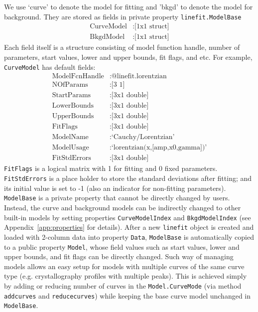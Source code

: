 \documentclass[reprint,showpacs,prb,nofootinbib,amsmath,amssymb]{revtex4-1}
\begin{document}
We use `curve' to denote the model for fitting and 'bkgd' to denote the model for background. They are stored as fields in private property \verb|linefit.ModelBase|
\begin{align}
	\mbox{CurveModel} 	&: \mbox{[1x1 struct]} \nonumber \\
	\mbox{BkgdModel}	&: \mbox{[1x1 struct]} \nonumber 
\end{align}
Each field itself is a structure consisting of model function handle, number of parameters, start values, lower and upper bounds, fit flags, and etc. For example, \verb|CurveModel| has default fields:
\begin{align}
	\mbox{ModelFcnHandle} 	&: \mbox{@linefit.lorentzian} \nonumber \\
	\mbox{NOfParams}	&: \mbox{[3 1]} \nonumber \\
	\mbox{StartParams}	&: \mbox{[3x1 double]} \nonumber \\
	\mbox{LowerBounds}	&: \mbox{[3x1 double]} \nonumber \\
	\mbox{UpperBounds}	&: \mbox{[3x1 double]} \nonumber \\
	\mbox{FitFlags}		&: \mbox{[3x1 double]} \nonumber \\
	\mbox{ModelName}	&: \mbox{`Cauchy/Lorentzian'} \nonumber \\	
	\mbox{ModelUsage}	&: \mbox{`lorentzian(x,[amp,x0,gamma])'} \nonumber \\
	\mbox{FitStdErrors}	&: \mbox{[3x1 double]} \nonumber 					
\end{align}
\verb|FitFlags| is a logical matrix with 1 for fitting and 0 fixed parameters. \verb|FitStdErrors| is a place holder to store the standard deviations after fitting; and its initial value is set to -1 (also an indicator for non-fitting parameters). \verb|ModelBase| is a private property that cannot be directly changed by users. Instead, the curve and background models can be indirectly changed to other built-in models by setting properties \verb|CurveModelIndex| and \verb|BkgdModelIndex| (see Appendix~\ref{app:properties} for details). After a new \verb|linefit| object is created and loaded with 2-column data into property \verb|Data|, \verb|ModelBase| is automatically copied to a public property \verb|Model|, whose field values such as start values, lower and upper bounds, and fit flags can be directly changed. Such way of managing models allows an easy setup for models with multiple curves of the same curve type (e.g. crystallography profiles with multiple peaks). This is achieved simply by adding or reducing number of curves in the \verb|Model.CurveMode| (via method \verb|addcurves| and \verb|reducecurves|) while keeping the base curve model unchanged in \verb|ModelBase|.
\end{document}
